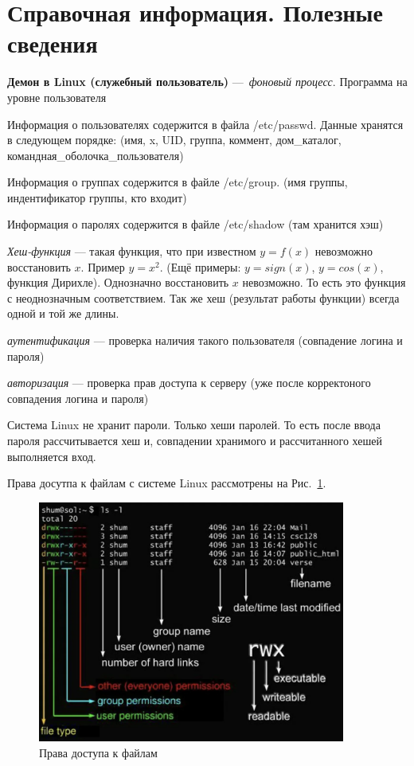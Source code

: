 \documentclass[oneside, final, 14pt]{extreport} %
\begin{document}
\section{Справочная информация. Полезные сведения}


\textbf{Демон в Linux (служебный пользователь)} --- \textit{фоновый процесс}. Программа на уровне пользователя

Информация о пользователях содержится в файла /etc/passwd. Данные хранятся в следующем порядке: (имя, x, UID, группа, коммент, дом\_каталог, командная\_оболочка\_пользователя)

Информация о группах содержится в файле /etc/group. (имя группы, индентификатор группы, кто входит)

Информация о паролях содержится в файле /etc/shadow (там хранится хэш)

\textit{Хеш-функция} --- такая функция, что при известном $ y = f(x) $ невозможно восстановить $x$.
Пример $ y = x^{2}$. (Ещё примеры: $y = sign(x)$, $y = cos(x)$, функция Дирихле). Однозначно восстановить $x $ невозможно. То есть это функция с неоднозначным соответствием.
Так же хеш (результат работы функции) всегда одной и той же длины.

\textit{аутентификация} --- проверка наличия такого пользователя (совпадение логина и пароля)

\textit{авторизация} --- проверка прав доступа к серверу (уже после корректоного совпадения логина и пароля)

Система Linux не хранит пароли. Только хеши паролей. То есть после ввода пароля рассчитывается хеш и, совпадении хранимого и рассчитанного хешей выполняется вход.


Права досутпа к файлам с системе Linux рассмотрены на Рис.~\ref{fig:7}.
\begin{figure}[ht]
    \centering
    \includegraphics[width=0.9\textwidth]{7.png}
    \caption{Права доступа к файлам}
    \label{fig:7}
\end{figure}
\end{document}
